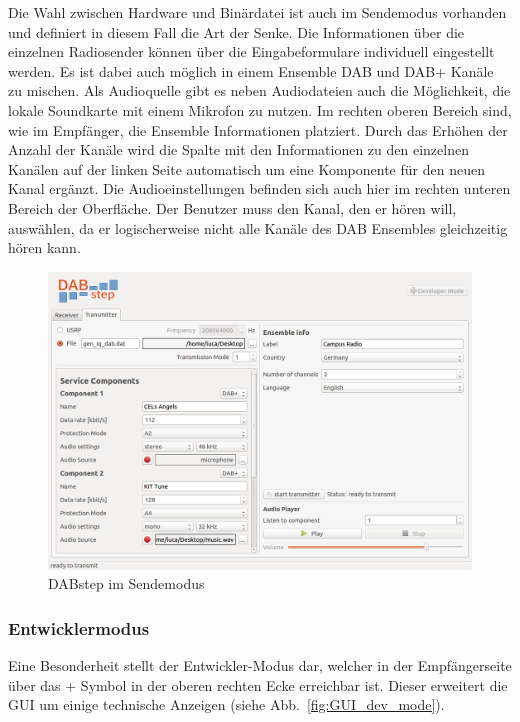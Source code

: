 Die Wahl zwischen Hardware und Binärdatei ist auch im Sendemodus vorhanden und definiert in diesem Fall die Art der Senke. Die Informationen über die einzelnen Radiosender können über die Eingabeformulare individuell eingestellt werden. Es ist dabei auch möglich in einem Ensemble DAB und DAB+ Kanäle zu mischen. Als Audioquelle gibt es neben Audiodateien auch die Möglichkeit, die lokale Soundkarte mit einem Mikrofon zu nutzen.
Im rechten oberen Bereich sind, wie im Empfänger, die Ensemble Informationen platziert. Durch das Erhöhen der Anzahl der Kanäle wird die Spalte mit den Informationen zu den einzelnen Kanälen auf der linken Seite automatisch um eine Komponente für den neuen Kanal ergänzt. Die Audioeinstellungen befinden sich auch hier im rechten unteren Bereich der Oberfläche. Der Benutzer muss den Kanal, den er hören will, auswählen, da er logischerweise nicht alle Kanäle des DAB Ensembles gleichzeitig hören kann.

\begin{figure}[htb]
\centering
  \includegraphics[width=\textwidth]{figures/GUI_transmitter.png}
	\caption{DABstep im Sendemodus}
	\label{fig:GUI_transmitter}
\end{figure}

\subsubsection{Entwicklermodus}
Eine Besonderheit stellt der Entwickler-Modus dar, welcher in der Empfängerseite über das \glqq +\grqq{}  Symbol in der oberen rechten Ecke erreichbar ist. Dieser erweitert die GUI um einige technische Anzeigen (siehe Abb.~\ref{fig:GUI_dev_mode}). 

